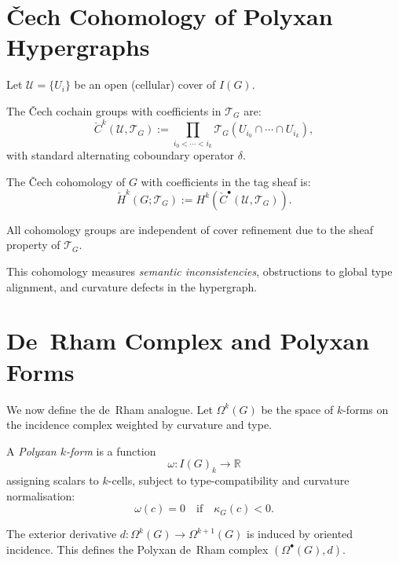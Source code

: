 \section{Čech Cohomology of Polyxan Hypergraphs}

Let $\mathcal{U}=\{U_i\}$ be an open (cellular) cover of $I(G)$.

\begin{definition}
The Čech cochain groups with coefficients in $\mathscr{T}_G$ are:
\[
\check{C}^k(\mathcal{U},\mathscr{T}_G)
   := \prod_{i_0<\cdots<i_k}
      \mathscr{T}_G(U_{i_0}\cap\cdots\cap U_{i_k}),
\]
with standard alternating coboundary operator $\delta$.
\end{definition}

\begin{definition}
The Čech cohomology of $G$ with coefficients in the tag sheaf is:
\[
\check{H}^k(G;\mathscr{T}_G) := H^k(\check{C}^\bullet(\mathcal{U},\mathscr{T}_G)).
\]
\end{definition}

All cohomology groups are independent of cover refinement due to the sheaf
property of $\mathscr{T}_G$.

This cohomology measures \textit{semantic inconsistencies}, obstructions to
global type alignment, and curvature defects in the hypergraph.

\section{De~Rham Complex and Polyxan Forms}

We now define the de~Rham analogue.
Let $\Omega^k(G)$ be the space of 
$k$-forms on the incidence complex weighted by curvature and type.

\begin{definition}
A \emph{Polyxan $k$-form} is a function
\[
\omega : I(G)_k \longrightarrow \mathbb{R}
\]
assigning scalars to $k$-cells, subject to type-compatibility and curvature
normalisation:
\[
\omega(c)=0 \quad\text{if}\quad \kappa_G(c) < 0.
\]
\end{definition}

The exterior derivative $d:\Omega^k(G)\to\Omega^{k+1}(G)$ is induced by
oriented incidence.  
This defines the Polyxan de~Rham complex $(\Omega^\bullet(G),d)$.

